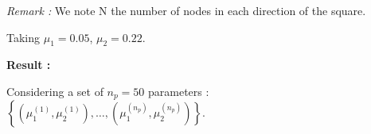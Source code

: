 {\begin{center}
\begin{minipage}{0.49\linewidth}
\begin{tcolorbox}
\begin{center}
\begin{minipage}{0.68\linewidth}
                        \small
                        \textit{Remark :} We note N the number of nodes in each direction of the square.
                    \end{minipage} \;
                    \begin{minipage}{0.3\linewidth}
                        \normalsize
                        Taking $\mu_1=0.05$, $\mu_2=0.22$.
                        \centering
                    \end{minipage}
                \end{center}

            \end{tcolorbox}
    
            \begin{tcolorbox}[
                colback=color1!50, %
                colframe=color2, %
                arc=2mm, %
                boxrule=2pt, %
                breakable, enhanced jigsaw,
                width=\linewidth
                ]            
                \textbf{Result :} \textbf{}

                Considering a set of $n_p=50$ parameters : $\left\{(\mu_1^{(1)},\mu_2^{(1)}),\dots,(\mu_1^{(n_p)},\mu_2^{(n_p)})\right\}$.
	
                \vspace{5pt}
                
                \hspace{20pt}\begin{minipage}{0.05\linewidth}
                    \normalsize
                \end{minipage}
                \begin{minipage}{0.8\linewidth}
                    \centering
                \end{minipage} 
            \end{tcolorbox}
        \end{minipage}
    \end{center}
}